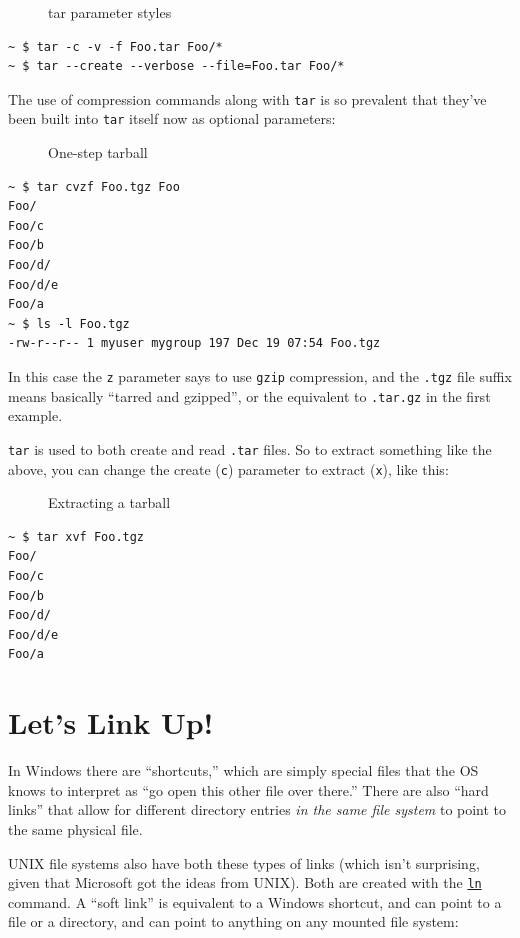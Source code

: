 \documentclass[10pt,]{book}
\numberwithin{figure}{chapter}
\DeclareRobustCommand{\drcap}[1]{\begin{figure}[H]\caption{#1}\end{figure}}
\DeclareRobustCommand{\drcmd}[1]{\index{Commands!#1}}
\begin{document}
\drcap{tar parameter styles}

\begin{verbatim}
~ $ tar -c -v -f Foo.tar Foo/*
~ $ tar --create --verbose --file=Foo.tar Foo/*
\end{verbatim}

The use of compression commands along with \texttt{tar} is so prevalent
that they've been built into \texttt{tar} itself now as optional
parameters:

\drcap{One-step tarball}

\begin{verbatim}
~ $ tar cvzf Foo.tgz Foo
Foo/
Foo/c
Foo/b
Foo/d/
Foo/d/e
Foo/a
~ $ ls -l Foo.tgz 
-rw-r--r-- 1 myuser mygroup 197 Dec 19 07:54 Foo.tgz
\end{verbatim}

In this case the \texttt{z} parameter says to use \texttt{gzip}
compression, and the \texttt{.tgz} file suffix means basically ``tarred
and gzipped'', or the equivalent to \texttt{.tar.gz} in the first
example.

\texttt{tar} is used to both create and read \texttt{.tar} files. So to
extract something like the above, you can change the create (\texttt{c})
parameter to extract (\texttt{x}), like this:

\drcap{Extracting a tarball}

\begin{verbatim}
~ $ tar xvf Foo.tgz 
Foo/
Foo/c
Foo/b
Foo/d/
Foo/d/e
Foo/a
\end{verbatim}

\section{Let's Link Up!}\label{lets-link-up}

In Windows there are ``shortcuts,'' which are simply special files that
the OS knows to interpret as ``go open this other file over there.''
There are also ``hard links'' that allow for different directory entries
\emph{in the same file system} to point to the same physical file.

UNIX file systems also have both these types of links (which isn't
surprising, given that Microsoft got the ideas from UNIX). Both are
created with the
\href{http://linux.die.net/man/1/ln}{\texttt{ln}}\drcmd{ln} command. A
``soft link'' is equivalent to a Windows shortcut, and
can point to a file or a directory, and can point to anything on any
mounted file system:
\end{document}
